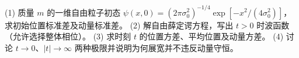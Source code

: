(1) 质量 \(m\) 的一维自由粒子初态 \(\psi(x,0)=(2\pi\sigma_0^2)^{-1/4}\exp[-x^2/(4\sigma_0^2)]\)，求初始位置标准差及动量标准差。
(2) 解自由薛定谔方程，写出 \(t>0\) 时波函数（允许选择整体相位）。
(3) 求时刻 \(t\) 的位置方差、平均位置及动量方差。
(4) 讨论 \(t\to0\)、\(|t|\to\infty\) 两种极限并说明为何展宽并不违反动量守恒。

